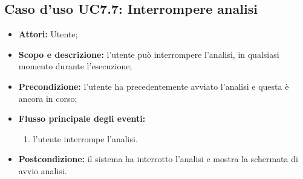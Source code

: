 \subsection{Caso d'uso UC7.7: Interrompere analisi}
\begin{itemize}
\item \textbf{Attori:} Utente;
\item \textbf{Scopo e descrizione:} l'utente può interrompere l'analisi, in qualsiasi momento durante l'esecuzione;
\item \textbf{Precondizione:} l'utente ha precedentemente avviato l'analisi e questa è ancora in corso;
\item \textbf{Flusso principale degli eventi:} 
\begin{enumerate}
\item l'utente interrompe l'analisi.
\end{enumerate}
\item \textbf{Postcondizione:} il sistema ha interrotto l'analisi e mostra la schermata di avvio analisi.
\end{itemize}


